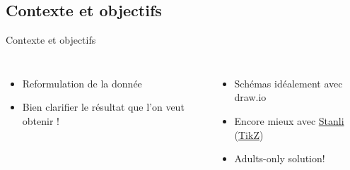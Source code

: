 \subsection{Contexte et objectifs}
\label{sec:Contexte et objectifs}

\begin{frame}[c]{Contexte et objectifs}
        \begin{columns}
        \begin{itemize}
            \item Reformulation de la donnée
            \item Bien clarifier le résultat que l’on veut obtenir !
            \end{itemize}
        
        \begin{itemize}
            \item Schémas idéalement avec draw.io
            \item Encore mieux avec \href{https://mirror.init7.net/ctan/graphics/pgf/contrib/stanli/stanli.pdf}{Stanli} (\href{https://tikz.net/category/engineering/mechanical-engineering/}{TikZ})
            \item Adults-only solution!
        \end{itemize}
    \end{columns}
\end{frame}

